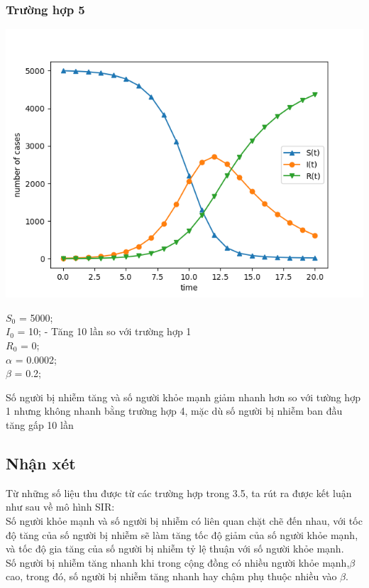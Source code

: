 \documentclass[a4paper]{article}
\begin{document}
\subsubsection{Trường hợp 5}
\begin{center}
\includegraphics{Images/5000 10 0 0_0002 0_2.png}
\end{center}
\begin{flushleft}
$S_0$ = 5000;\\
$I_0$ = 10; - Tăng 10 lần so với trường hợp 1\\
$R_0$ = 0;\\
$\alpha$ = 0.0002;\\
$\beta$ = 0.2;\\
\end{flushleft}
Số người bị nhiễm tăng và số người khỏe mạnh giảm nhanh hơn so với tường hợp 1 nhưng không nhanh bằng trường hợp 4, mặc dù số người bị nhiễm ban đầu tăng gấp 10 lần
\subsection{Nhận xét}
Từ những số liệu thu được từ các trường hợp trong 3.5, ta rút ra được kết luận như sau về mô hình SIR:\\
Số người khỏe mạnh và số người bị nhiễm có liên quan chặt chẽ đến nhau, với tốc độ tăng của số người bị nhiễm sẽ làm tăng tốc độ giảm của số người khỏe mạnh, và tốc độ gia tăng của số người bị nhiễm tỷ lệ thuận với số người khỏe mạnh.\\
Số người bị nhiễm tăng nhanh khi trong cộng đồng có nhiều người khỏe mạnh,$\beta$ cao, trong đó, số người bị nhiễm tăng nhanh hay chậm phụ thuộc nhiều vào $\beta$.
\end{document}

